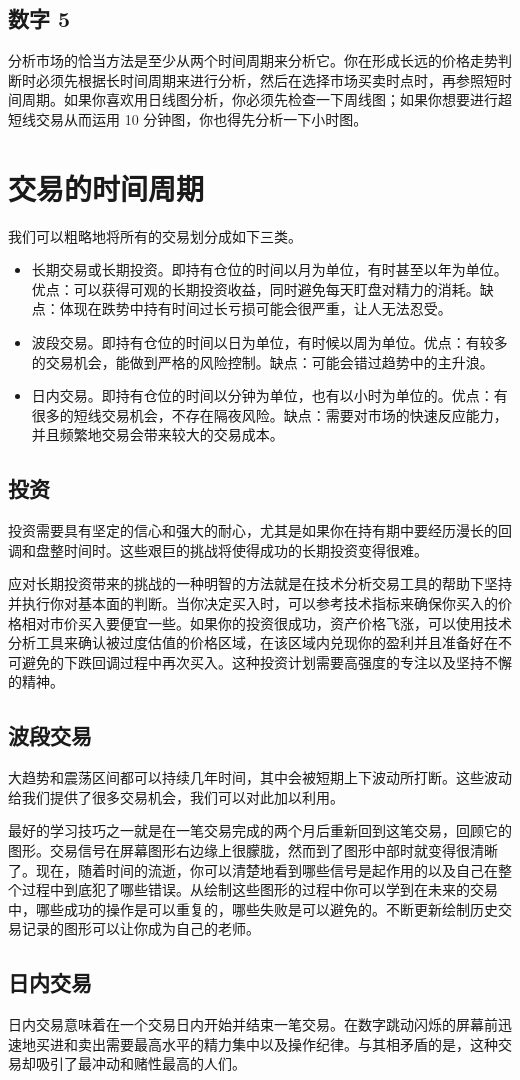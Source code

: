 \subsection*{数字 5}
分析市场的恰当方法是至少从两个时间周期来分析它。你在形成长远的价格走势判断时必须先根据长时间周期来进行分析，然后在选择市场买卖时点时，再参照短时间周期。如果你喜欢用日线图分析，你必须先检查一下周线图；如果你想要进行超短线交易从而运用 10 分钟图，你也得先分析一下小时图。
\section{交易的时间周期}
我们可以粗略地将所有的交易划分成如下三类。
\begin{itemize}
    \item 长期交易或长期投资。即持有仓位的时间以月为单位，有时甚至以年为单位。优点：可以获得可观的长期投资收益，同时避免每天盯盘对精力的消耗。缺点：体现在跌势中持有时间过长亏损可能会很严重，让人无法忍受。
    \item 波段交易。即持有仓位的时间以日为单位，有时候以周为单位。优点：有较多的交易机会，能做到严格的风险控制。缺点：可能会错过趋势中的主升浪。
    \item 日内交易。即持有仓位的时间以分钟为单位，也有以小时为单位的。优点：有很多的短线交易机会，不存在隔夜风险。缺点：需要对市场的快速反应能力，并且频繁地交易会带来较大的交易成本。
\end{itemize}
\subsection*{投资}
投资需要具有坚定的信心和强大的耐心，尤其是如果你在持有期中要经历漫长的回调和盘整时间时。这些艰巨的挑战将使得成功的长期投资变得很难。

应对长期投资带来的挑战的一种明智的方法就是在技术分析交易工具的帮助下坚持并执行你对基本面的判断。当你决定买入时，可以参考技术指标来确保你买入的价格相对市价买入要便宜一些。如果你的投资很成功，资产价格飞涨，可以使用技术分析工具来确认被过度估值的价格区域，在该区域内兑现你的盈利并且准备好在不可避免的下跌回调过程中再次买入。这种投资计划需要高强度的专注以及坚持不懈的精神。
\subsection*{波段交易}
大趋势和震荡区间都可以持续几年时间，其中会被短期上下波动所打断。这些波动给我们提供了很多交易机会，我们可以对此加以利用。

最好的学习技巧之一就是在一笔交易完成的两个月后重新回到这笔交易，回顾它的图形。交易信号在屏幕图形右边缘上很朦胧，然而到了图形中部时就变得很清晰了。现在，随着时间的流逝，你可以清楚地看到哪些信号是起作用的以及自己在整个过程中到底犯了哪些错误。从绘制这些图形的过程中你可以学到在未来的交易中，哪些成功的操作是可以重复的，哪些失败是可以避免的。不断更新绘制历史交易记录的图形可以让你成为自己的老师。
\subsection*{日内交易}
日内交易意味着在一个交易日内开始并结束一笔交易。在数字跳动闪烁的屏幕前迅速地买进和卖出需要最高水平的精力集中以及操作纪律。与其相矛盾的是，这种交易却吸引了最冲动和赌性最高的人们。